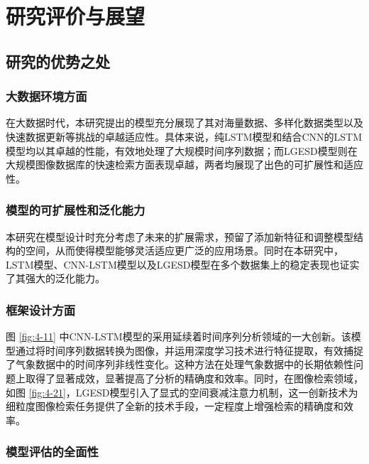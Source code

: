 \section{研究评价与展望}

\subsection{研究的优势之处}



\subsubsection{大数据环境方面}

在大数据时代，本研究提出的模型充分展现了其对海量数据、多样化数据类型以及快速数据更新等挑战的卓越适应性。具体来说，纯LSTM模型和结合CNN的LSTM模型均以其卓越的性能，有效地处理了大规模时间序列数据；而LGESD模型则在大规模图像数据库的快速检索方面表现卓越，两者均展现了出色的可扩展性和适应性。

\subsubsection{模型的可扩展性和泛化能力}

本研究在模型设计时充分考虑了未来的扩展需求，预留了添加新特征和调整模型结构的空间，从而使得模型能够灵活适应更广泛的应用场景。同时在本研究中，LSTM模型、CNN-LSTM模型以及LGESD模型在多个数据集上的稳定表现也证实了其强大的泛化能力。

\subsubsection{框架设计方面}

图 \ref{fig:4-11} 中CNN-LSTM模型的采用延续着时间序列分析领域的一大创新。该模型通过将时间序列数据转换为图像，并运用深度学习技术进行特征提取，有效捕捉了气象数据中的时间序列非线性变化。这种方法在处理气象数据中的长期依赖性问题上取得了显著成效，显著提高了分析的精确度和效率。同时，在图像检索领域，如图 \ref{fig:4-21}，LGESD模型引入了显式的空间衰减注意力机制，这一创新技术为细粒度图像检索任务提供了全新的技术手段，一定程度上增强检索的精确度和效率。

\subsubsection{模型评估的全面性}

